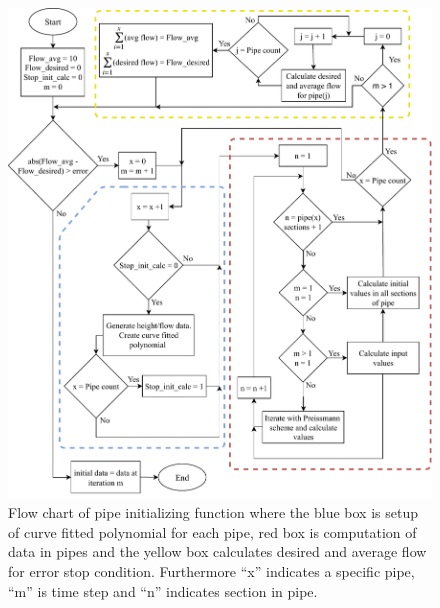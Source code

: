 \begin{figure}[H]
\centering
\includegraphics[width=1.05 \textwidth]{report/simulation/pictures/init_pipe_chart.pdf}
\caption{Flow chart of pipe initializing function where the blue box is setup of curve fitted polynomial for each pipe, red box is computation of data in pipes and the yellow box calculates desired and average flow for error stop condition. Furthermore ``x'' indicates a specific pipe, ``m'' is time step and ``n'' indicates section in pipe.}
\label{fig:init_pipe_chart}
\end{figure}

